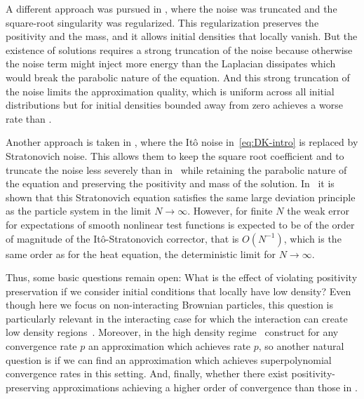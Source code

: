 \documentclass[a4paper,12pt]{article}
\begin{document}
A different approach was pursued in \cite{Djurdjevac2024, Djurdjevac2026}, where the noise was truncated and the square-root singularity was regularized. This regularization preserves the positivity and the mass, and it allows initial densities that locally vanish. But the existence of solutions requires a strong truncation of the noise because otherwise the noise term might inject more energy than the Laplacian dissipates which would break the parabolic nature of the equation. And this strong truncation of the noise limits the approximation quality, which is uniform across all initial distributions but for initial densities bounded away from zero achieves a worse rate than \cite{Cornalba2023, Cornalba2023Density}. 


Another approach is taken in \cite{Fehrman2024, Fehrman2023}, where the It\^o noise in~\eqref{eq:DK-intro} is replaced by Stratonovich noise. This allows them to keep the square root coefficient and to truncate the noise less severely than in~\cite{Djurdjevac2024, Djurdjevac2026} while retaining the parabolic nature of the equation and preserving the positivity and mass of the solution. In~\cite{Fehrman2023, Wu2022, Ji2026} it is shown that this Stratonovich equation satisfies the same large deviation principle as the particle system in the limit $N \to \infty$. However, for finite $N$ the weak error for expectations of smooth nonlinear test functions is expected to be of the order of magnitude of the It\^o-Stratonovich corrector, that is $O(N^{-1})$, which is the same order as for the heat equation, the deterministic limit for $N \to \infty$. 


Thus, some basic questions remain open: What is the effect of violating positivity preservation if we consider initial conditions that locally have low density? Even though here we focus on non-interacting Brownian particles, this question is particularly relevant in the interacting case for which the interaction can create low density regions~\cite{Wehlitz2025}. Moreover, in the high density regime~\cite{Cornalba2023} construct for any convergence rate $p$ an approximation which achieves rate $p$, so another natural question is if we can find an approximation which achieves superpolynomial convergence rates in this setting. And, finally, whether there exist positivity-preserving approximations achieving a higher order of convergence than those in \cite{Djurdjevac2024}.
\end{document}

